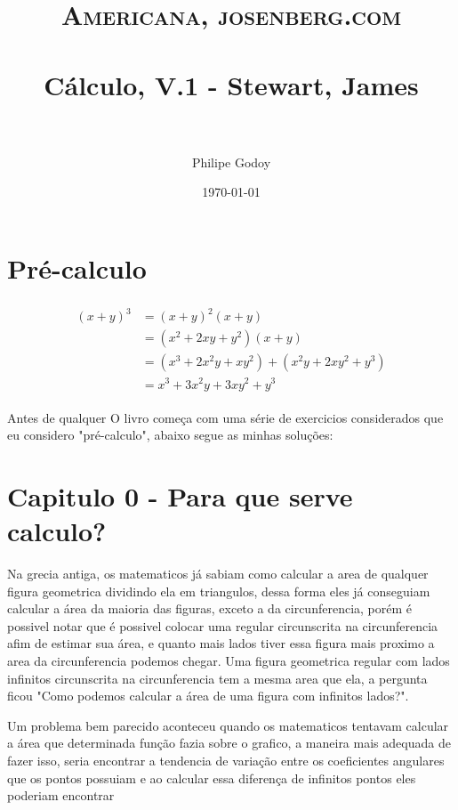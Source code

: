 \documentclass[paper=a4, fontsize=11pt]{scrartcl} %
\title{	
\normalfont \normalsize 
\textsc{Americana, josenberg.com} \\ [25pt] %
\horrule{0.5pt} \\[0.4cm] %
\huge Cálculo, V.1 - Stewart, James  \\ %
\horrule{2pt} \\[0.5cm] %
}
\author{Philipe Godoy} %
\date{\normalsize\today} %
\numberwithin{equation}{section} %
\numberwithin{figure}{section} %
\numberwithin{table}{section} %
\begin{document}
\maketitle %


\section{Pré-calculo}

\lipsum[2] %

\begin{align} 
\begin{split}
(x+y)^3 	&= (x+y)^2(x+y)\\
&=(x^2+2xy+y^2)(x+y)\\
&=(x^3+2x^2y+xy^2) + (x^2y+2xy^2+y^3)\\
&=x^3+3x^2y+3xy^2+y^3
\end{split}					
\end{align}

Antes de qualquer O livro começa com uma série de exercicios considerados que eu considero "pré-calculo", abaixo segue as minhas soluções:


\section{Capitulo 0 - Para que serve calculo?}
Na grecia antiga, os matematicos já sabiam como calcular a area de qualquer figura geometrica dividindo ela em triangulos, dessa forma eles já conseguiam calcular a área da maioria das figuras, exceto a da circunferencia, porém é possivel notar que é possivel colocar uma regular circunscrita na circunferencia afim de estimar sua área, e quanto mais lados tiver essa figura mais proximo a area da circunferencia podemos chegar. Uma figura geometrica regular com lados infinitos circunscrita na circunferencia tem a mesma area que ela, a pergunta ficou "Como podemos calcular a área de uma figura com infinitos lados?". 

Um problema bem parecido aconteceu quando os matematicos tentavam calcular a área que determinada função fazia sobre o grafico,
a maneira mais adequada de fazer isso, seria encontrar a tendencia de variação entre os coeficientes angulares que os pontos possuiam e ao calcular essa diferença de infinitos pontos eles poderiam encontrar 
\end{document}
